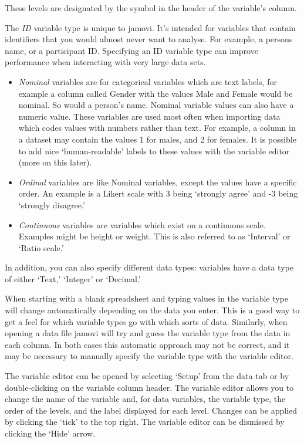 \documentclass[
]{book}
\providecommand{\tightlist}{%
  \setlength{\itemsep}{0pt}\setlength{\parskip}{0pt}}
\begin{document}
These levels are designated by the symbol in the header of the variable's column.

The \emph{ID} variable type is unique to jamovi. It's intended for variables that contain identifiers that you would almost never want to analyse. For example, a persons name, or a participant ID. Specifying an ID variable type can improve performance when interacting with very large data sets.

\begin{itemize}
\tightlist
\item
  \emph{Nominal} variables are for categorical variables which are text labels, for example a column called Gender with the values Male and Female would be nominal. So would a person's name. Nominal variable values can also have a numeric value. These variables are used most often when importing data which codes values with numbers rather than text. For example, a column in a dataset may contain the values 1 for males, and 2 for females. It is possible to add nice `human-readable' labels to these values with the variable editor (more on this later).
\item
  \emph{Ordinal} variables are like Nominal variables, except the values have a specific order. An example is a Likert scale with 3 being `strongly agree' and -3 being `strongly disagree.'
\item
  \emph{Continuous} variables are variables which exist on a continuous scale. Examples might be height or weight. This is also referred to as `Interval' or `Ratio scale.'
\end{itemize}

In addition, you can also specify different data types: variables have a data type of either `Text,' `Integer' or `Decimal.'

When starting with a blank spreadsheet and typing values in the variable type will change automatically depending on the data you enter. This is a good way to get a feel for which variable types go with which sorts of data. Similarly, when opening a data file jamovi will try and guess the variable type from the data in each column. In both cases this automatic approach may not be correct, and it may be necessary to manually specify the variable type with the variable editor.

The variable editor can be opened by selecting `Setup' from the data tab or by double-clicking on the variable column header. The variable editor allows you to change the name of the variable and, for data variables, the variable type, the order of the levels, and the label displayed for each level. Changes can be applied by clicking the `tick' to the top right. The variable editor can be dismissed by clicking the `Hide' arrow.
\end{document}
